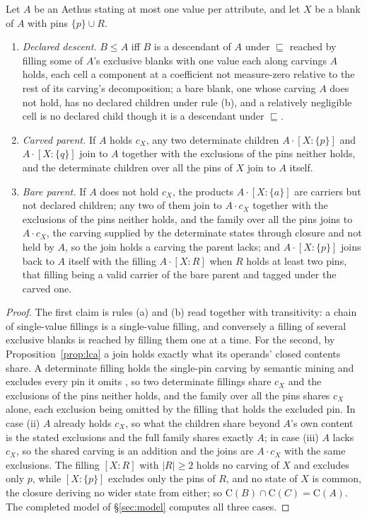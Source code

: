 \begin{prop}\label{prop:descent} Let $A$ be an Aethus stating at most one value per attribute, and let $X$ be a blank of $A$ with pins $\{p\} \cup R$. \begin{enumerate} \item[(i)] \emph{Declared descent.} $B \le A$ iff $B$ is a descendant of $A$ under $\sqsubseteq$ reached by filling some of $A$'s exclusive blanks with one value each along carvings $A$ holds, each cell a component at a coefficient not measure-zero relative to the rest of its carving's decomposition; a bare blank, one whose carving $A$ does not hold, has no declared children under rule (b), and a relatively negligible cell is no declared child though it is a descendant under $\sqsubseteq$.
\item[(ii)] \emph{Carved parent.} If $A$ holds $c_X$, any two determinate children $A \cdot [X : \{p\}]$ and $A \cdot [X : \{q\}]$ join to $A$ together with the exclusions of the pins neither holds, and the determinate children over all the pins of $X$ join to $A$ itself.
\item[(iii)] \emph{Bare parent.} If $A$ does not hold $c_X$, the products $A \cdot [X : \{a\}]$ are carriers but not declared children; any two of them join to $A \cdot c_X$ together with the exclusions of the pins neither holds, and the family over all the pins joins to $A \cdot c_X$, the carving supplied by the determinate states through closure and not held by $A$, so the join holds a carving the parent lacks; and $A \cdot [X : \{p\}]$ joins back to $A$ itself with the filling $A \cdot [X : R]$ when $R$ holds at least two pins, that filling being a valid carrier of the bare parent and tagged under the carved one.
\end{enumerate}
\end{prop}
\begin{proof}
The first claim is rules (a) and (b) read together with transitivity: a chain of single-value fillings is a single-value filling, and conversely a filling of several exclusive blanks is reached by filling them one at a time. For the second, by Proposition~\ref{prop:lca} a join holds exactly what its operands' closed contents share. A determinate filling holds the single-pin carving by semantic mining and excludes every pin it omits \cite{Aethus}, so two determinate fillings share $c_X$ and the exclusions of the pins neither holds, and the family over all the pins shares $c_X$ alone, each exclusion being omitted by the filling that holds the excluded pin. In case (ii) $A$ already holds $c_X$, so what the children share beyond $A$'s own content is the stated exclusions and the full family shares exactly $A$; in case (iii) $A$ lacks $c_X$, so the shared carving is an addition and the joins are $A \cdot c_X$ with the same exclusions. The filling $[X : R]$ with $|R| \ge 2$ holds no carving of $X$ and excludes only $p$, while $[X : \{p\}]$ excludes only the pins of $R$, and no state of $X$ is common, the closure deriving no wider state from either; so $\mathrm{C}(B) \cap \mathrm{C}(C) = \mathrm{C}(A)$. The completed model of §\ref{sec:model} computes all three cases.
\end{proof}

